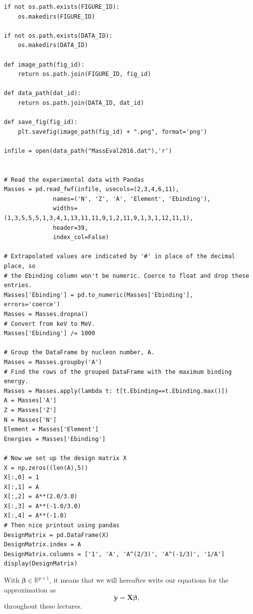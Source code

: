 \documentclass{beamer}
\begin{document}
\begin{frame}
\begin{verbatim}
if not os.path.exists(FIGURE_ID):
    os.makedirs(FIGURE_ID)

if not os.path.exists(DATA_ID):
    os.makedirs(DATA_ID)

def image_path(fig_id):
    return os.path.join(FIGURE_ID, fig_id)

def data_path(dat_id):
    return os.path.join(DATA_ID, dat_id)

def save_fig(fig_id):
    plt.savefig(image_path(fig_id) + ".png", format='png')

infile = open(data_path("MassEval2016.dat"),'r')


# Read the experimental data with Pandas
Masses = pd.read_fwf(infile, usecols=(2,3,4,6,11),
              names=('N', 'Z', 'A', 'Element', 'Ebinding'),
              widths=(1,3,5,5,5,1,3,4,1,13,11,11,9,1,2,11,9,1,3,1,12,11,1),
              header=39,
              index_col=False)

# Extrapolated values are indicated by '#' in place of the decimal place, so
# the Ebinding column won't be numeric. Coerce to float and drop these entries.
Masses['Ebinding'] = pd.to_numeric(Masses['Ebinding'], errors='coerce')
Masses = Masses.dropna()
# Convert from keV to MeV.
Masses['Ebinding'] /= 1000

# Group the DataFrame by nucleon number, A.
Masses = Masses.groupby('A')
# Find the rows of the grouped DataFrame with the maximum binding energy.
Masses = Masses.apply(lambda t: t[t.Ebinding==t.Ebinding.max()])
A = Masses['A']
Z = Masses['Z']
N = Masses['N']
Element = Masses['Element']
Energies = Masses['Ebinding']

# Now we set up the design matrix X
X = np.zeros((len(A),5))
X[:,0] = 1
X[:,1] = A
X[:,2] = A**(2.0/3.0)
X[:,3] = A**(-1.0/3.0)
X[:,4] = A**(-1.0)
# Then nice printout using pandas
DesignMatrix = pd.DataFrame(X)
DesignMatrix.index = A
DesignMatrix.columns = ['1', 'A', 'A^(2/3)', 'A^(-1/3)', '1/A']
display(DesignMatrix)

\end{verbatim}


With $\bm{\beta}\in {\mathbb{R}}^{p\times 1}$, it means that we will hereafter write our equations for the approximation as
\[
\bm{\tilde{y}}= \bm{X}\bm{\beta},
\]
throughout these lectures.
\end{frame}
\end{document}
